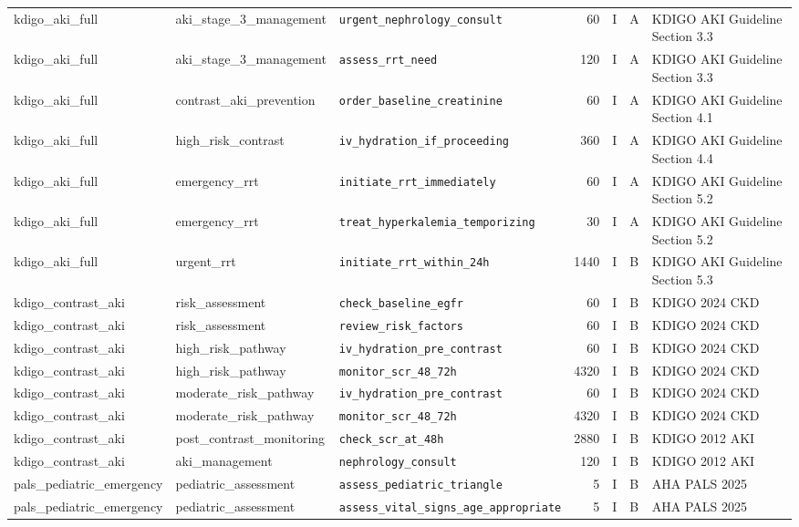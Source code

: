 \begin{longtable}{lllrrll}
kdigo\_aki\_full & aki\_stage\_3\_management & \texttt{urgent\_nephrology\_consult} & 60 & I & A & KDIGO AKI Guideline Section 3.3 \\
kdigo\_aki\_full & aki\_stage\_3\_management & \texttt{assess\_rrt\_need} & 120 & I & A & KDIGO AKI Guideline Section 3.3 \\
kdigo\_aki\_full & contrast\_aki\_prevention & \texttt{order\_baseline\_creatinine} & 60 & I & A & KDIGO AKI Guideline Section 4.1 \\
kdigo\_aki\_full & high\_risk\_contrast & \texttt{iv\_hydration\_if\_proceeding} & 360 & I & A & KDIGO AKI Guideline Section 4.4 \\
kdigo\_aki\_full & emergency\_rrt & \texttt{initiate\_rrt\_immediately} & 60 & I & A & KDIGO AKI Guideline Section 5.2 \\
kdigo\_aki\_full & emergency\_rrt & \texttt{treat\_hyperkalemia\_temporizing} & 30 & I & A & KDIGO AKI Guideline Section 5.2 \\
kdigo\_aki\_full & urgent\_rrt & \texttt{initiate\_rrt\_within\_24h} & 1440 & I & B & KDIGO AKI Guideline Section 5.3 \\
kdigo\_contrast\_aki & risk\_assessment & \texttt{check\_baseline\_egfr} & 60 & I & B & KDIGO 2024 CKD \\
kdigo\_contrast\_aki & risk\_assessment & \texttt{review\_risk\_factors} & 60 & I & B & KDIGO 2024 CKD \\
kdigo\_contrast\_aki & high\_risk\_pathway & \texttt{iv\_hydration\_pre\_contrast} & 60 & I & B & KDIGO 2024 CKD \\
kdigo\_contrast\_aki & high\_risk\_pathway & \texttt{monitor\_scr\_48\_72h} & 4320 & I & B & KDIGO 2024 CKD \\
kdigo\_contrast\_aki & moderate\_risk\_pathway & \texttt{iv\_hydration\_pre\_contrast} & 60 & I & B & KDIGO 2024 CKD \\
kdigo\_contrast\_aki & moderate\_risk\_pathway & \texttt{monitor\_scr\_48\_72h} & 4320 & I & B & KDIGO 2024 CKD \\
kdigo\_contrast\_aki & post\_contrast\_monitoring & \texttt{check\_scr\_at\_48h} & 2880 & I & B & KDIGO 2012 AKI \\
kdigo\_contrast\_aki & aki\_management & \texttt{nephrology\_consult} & 120 & I & B & KDIGO 2012 AKI \\
pals\_pediatric\_emergency & pediatric\_assessment & \texttt{assess\_pediatric\_triangle} & 5 & I & B & AHA PALS 2025 \\
pals\_pediatric\_emergency & pediatric\_assessment & \texttt{assess\_vital\_signs\_age\_appropriate} & 5 & I & B & AHA PALS 2025 \\

\end{longtable}
